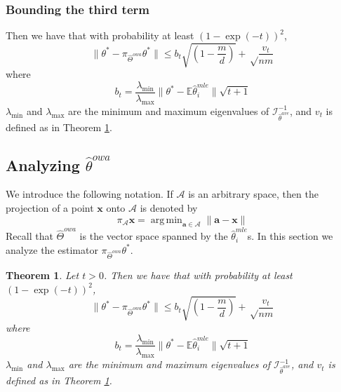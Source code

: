 \documentclass[twoside]{article}
\newtheorem{theorem}{Theorem}
\DeclareMathOperator*{\argmin}{arg\,min}
\newcommand{\W}{{\hat \Theta^{\textit{owa}}}}
\newcommand{\Wave}{{\mathcal{\hat W}^{ave}}}
\newcommand{\A}{\mathcal{A}}
\newcommand{\E}{\mathbb{E}}
\newcommand{\x}{\mathbf{x}}
\newcommand{\w}{\theta}
\newcommand{\wowa}{\hat\w^{owa}}
\newcommand{\wave}{\hat\w^{ave}}
\newcommand{\wmle}{\hat\w^{mle}}
\newcommand{\wstar}{{\w^{*}}}
\newcommand{\tbias}{t_{\text{\textit{bias}}}}
\newcommand{\I}{\mathcal I}
\newcommand{\ltwo}[1]{{\lVert {#1} \rVert}}
\newcommand{\lzero}[1]{{\lVert {#1} \rVert}_0}
\newcommand{\proj}[1]{\pi_{{#1}}}
\begin{document}
\subsubsection{Bounding the third term}
Then we have that with probability at least $(1-\exp(-t))^2$,
\begin{equation}
\ltwo{\wstar-\proj\W\wstar}
\le
b_t\sqrt{\left(1-\frac{m}{d}\right)}
+
\sqrt\frac{v_{t}}{nm}
\end{equation}
where
\begin{equation}
b_t = \frac{\lambda_{\min}}{\lambda_{\max}}\ltwo{\wstar-\E\wmle_i}\sqrt{t + 1}
\end{equation}
$\lambda_{\min}$ and $\lambda_{\max}$ are the minimum and maximum eigenvalues of $\I^{-1}_{\wave}$,
and $v_t$ is defined as in Theorem \ref{thm:wave}.


\subsection {Analyzing $\wowa$}

%

We introduce the following notation.
If $\A$ is an arbitrary space,
then the projection of a point $\x$ onto $\A$ is denoted by
\begin{equation}
\proj{\A}\x = \argmin_{\mathbf{a}\in\A} \ltwo{\mathbf{a}-\x}
\end{equation}
Recall that $\W$ is the vector space spanned by the $\wmle_i$s.
In this section we analyze the estimator $\proj{\W}\wstar$.

\begin{theorem}
\label{thm:wave}
Let $t>0$.
Then we have that with probability at least $(1-\exp(-t))^2$,
\begin{equation}
\ltwo{\wstar-\proj\W\wstar}
\le
b_t\sqrt{\left(1-\frac{m}{d}\right)}
+
\sqrt\frac{v_{t}}{nm}
\end{equation}
where
\begin{equation}
b_t = \frac{\lambda_{\min}}{\lambda_{\max}}\ltwo{\wstar-\E\wmle_i}\sqrt{t + 1}
\end{equation}
$\lambda_{\min}$ and $\lambda_{\max}$ are the minimum and maximum eigenvalues of $\I^{-1}_{\wave}$,
and $v_t$ is defined as in Theorem \ref{thm:wave}.
\end{theorem}
\end{document}

